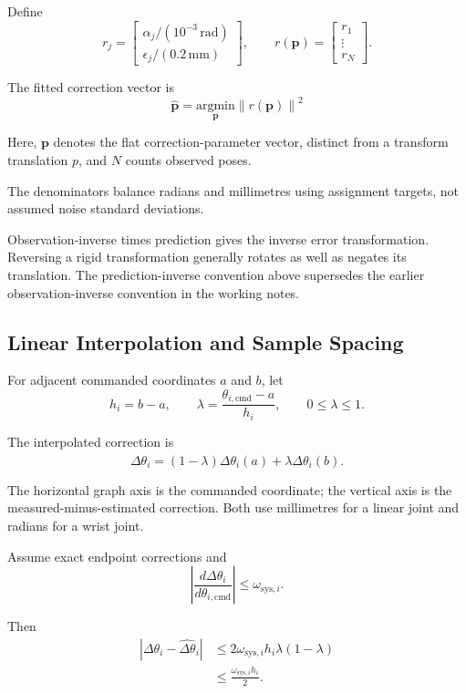 \documentclass[11pt,letterpaper]{article}
\begin{document}
Define
\[
r_j=
\begin{bmatrix}
\alpha_j/(10^{-3}\,\mathrm{rad})\\
\epsilon_j/(0.2\,\mathrm{mm})
\end{bmatrix},
\qquad
r(\boldsymbol{p})=
\begin{bmatrix}
r_1\\
\vdots\\
r_N
\end{bmatrix}.
\]

The fitted correction vector is
\[
\boxed{
\hat{\boldsymbol{p}}
=
\underset{\boldsymbol{p}}{\mathrm{argmin}}
\left\|r(\boldsymbol{p})\right\|^2
}
\]

Here, $\boldsymbol{p}$ denotes the flat
correction-parameter vector, distinct from a
transform translation $p$, and $N$ counts
observed poses.

The denominators balance radians and millimetres
using assignment targets, not assumed noise
standard deviations.

Observation-inverse times prediction gives the
inverse error transformation. Reversing a rigid
transformation generally rotates as well as
negates its translation. The prediction-inverse
convention above supersedes the earlier
observation-inverse convention in the working notes.

\subsection{Linear Interpolation and Sample Spacing}

For adjacent commanded coordinates $a$ and $b$, let
\[
h_i=b-a,
\qquad
\lambda=
\frac{\theta_{i,\mathrm{cmd}}-a}{h_i},
\qquad
0\leq\lambda\leq1.
\]

The interpolated correction is
\[
\widehat{\Delta\theta}_i
=
(1-\lambda)\Delta\theta_i(a)
+
\lambda\Delta\theta_i(b).
\]

The horizontal graph axis is the commanded
coordinate; the vertical axis is the
measured-minus-estimated correction.
Both use millimetres for a linear joint
and radians for a wrist joint.

Assume exact endpoint corrections and
\[
\left|
\frac{d\Delta\theta_i}{d\theta_{i,\mathrm{cmd}}}
\right|
\leq\omega_{\mathrm{sys},i}.
\]

Then
\[
\begin{aligned}
\left|
\Delta\theta_i-\widehat{\Delta\theta}_i
\right|
&\leq
2\omega_{\mathrm{sys},i}h_i
\lambda(1-\lambda)\\
&\leq
\frac{\omega_{\mathrm{sys},i}h_i}{2}.
\end{aligned}
\]
\end{document}
